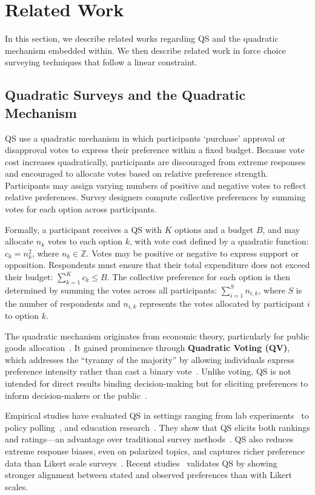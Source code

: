 \section{Related Work}
\label{sec:relatedWorks}
In this section, we describe related works regarding QS and the quadratic mechanism embedded within. We then describe related work in force choice surveying techniques that follow a linear constraint.

\subsection{Quadratic Surveys and the Quadratic Mechanism}
QS use a quadratic mechanism in which participants `purchase' approval or disapproval votes to express their preference within a fixed budget. Because vote cost increases quadratically, participants are discouraged from extreme responses and encouraged to allocate votes based on relative preference strength. Participants may assign varying numbers of positive and negative votes to reflect relative preferences. Survey designers compute collective preferences by summing votes for each option across participants.

Formally, a participant receives a QS with $K$ options and a budget $B$, and may allocate $n_k$ votes to each option $k$, with vote cost defined by a quadratic function: $c_k = n_k^2$, where $n_k \in \mathbb{Z}$. Votes may be positive or negative to express support or opposition. Respondents must ensure that their total expenditure does not exceed their budget: $\sum_{k=1}^{K} c_k \leq B$. The collective preference for each option is then determined by summing the votes across all participants: $\sum_{i=1}^{S} n_{i,k}$, where $S$ is the number of respondents and $n_{i,k}$ represents the votes allocated by participant $i$ to option $k$.

The quadratic mechanism originates from economic theory, particularly for public goods allocation~\cite{grovesOptimalAllocationPublic1977}. It gained prominence through \textbf{Quadratic Voting (QV)}, which addresses the ``tyranny of the majority'' by allowing individuals express preference intensity rather than cast a binary vote~\cite{posner2018radical}. Unlike voting, QS is not intended for direct results binding decision-making but for eliciting preferences to inform decision-makers or the public~\cite{chengOrganizeThenVote2025}.

Empirical studies have evaluated QS in settings ranging from lab experiments~\cite{chengCanShowWhat2021,quarfoot2017quadratic} to policy polling~\cite{cavaille2024cares, hollandDistributiveImpactsSupport2022}, and education research~\cite{naylor2017first}. They show that QS elicits both rankings and ratings---an advantage over traditional survey methods~\cite{chengCanShowWhat2021}. QS also reduces  extreme response biases, even on polarized topics, and captures richer preference data than Likert scale surveys~\cite{quarfoot2017quadratic, cavaille2024cares, chengCanShowWhat2021, naylor2017first}. Recent studies~\cite{cavaille2024cares, chengCanShowWhat2021} validates QS by showing stronger alignment between stated and observed preferences than with Likert scales.

